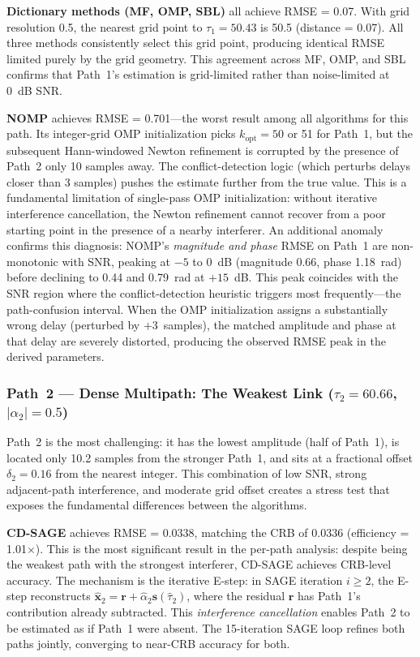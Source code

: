 \documentclass[journal]{IEEEtran}
\begin{document}
\textbf{Dictionary methods (MF, OMP, SBL)} all achieve RMSE = 0.07. With grid resolution 0.5, the nearest grid point to $\tau_1 = 50.43$ is 50.5 (distance = 0.07). All three methods consistently select this grid point, producing identical RMSE limited purely by the grid geometry. This agreement across MF, OMP, and SBL confirms that Path~1's estimation is grid-limited rather than noise-limited at 0~dB SNR.

\textbf{NOMP} achieves RMSE = 0.701---the worst result among all algorithms for this path. Its integer-grid OMP initialization picks $k_{\text{opt}} = 50$ or 51 for Path~1, but the subsequent Hann-windowed Newton refinement is corrupted by the presence of Path~2 only 10 samples away. The conflict-detection logic (which perturbs delays closer than 3 samples) pushes the estimate further from the true value. This is a fundamental limitation of single-pass OMP initialization: without iterative interference cancellation, the Newton refinement cannot recover from a poor starting point in the presence of a nearby interferer. An additional anomaly confirms this diagnosis: NOMP's \textit{magnitude and phase} RMSE on Path~1 are non-monotonic with SNR, peaking at $-5$ to $0$~dB (magnitude 0.66, phase 1.18~rad) before declining to 0.44 and 0.79~rad at $+15$~dB. This peak coincides with the SNR region where the conflict-detection heuristic triggers most frequently---the path-confusion interval. When the OMP initialization assigns a substantially wrong delay (perturbed by $+3$~samples), the matched amplitude and phase at that delay are severely distorted, producing the observed RMSE peak in the derived parameters.

\subsubsection{Path~2 --- Dense Multipath: The Weakest Link ($\tau_2 = 60.66$, $|\alpha_2| = 0.5$)}

Path~2 is the most challenging: it has the lowest amplitude (half of Path~1), is located only 10.2 samples from the stronger Path~1, and sits at a fractional offset $\delta_2 = 0.16$ from the nearest integer. This combination of low SNR, strong adjacent-path interference, and moderate grid offset creates a stress test that exposes the fundamental differences between the algorithms.

\textbf{CD-SAGE} achieves RMSE = 0.0338, matching the CRB of 0.0336 (efficiency = 1.01$\times$). This is the most significant result in the per-path analysis: despite being the weakest path with the strongest interferer, CD-SAGE achieves CRB-level accuracy. The mechanism is the iterative E-step: in SAGE iteration $i \ge 2$, the E-step reconstructs $\hat{\mathbf{x}}_2 = \mathbf{r} + \hat{\alpha}_2\mathbf{s}(\hat{\tau}_2)$, where the residual $\mathbf{r}$ has Path~1's contribution already subtracted. This \textit{interference cancellation} enables Path~2 to be estimated as if Path~1 were absent. The 15-iteration SAGE loop refines both paths jointly, converging to near-CRB accuracy for both.
\end{document}
